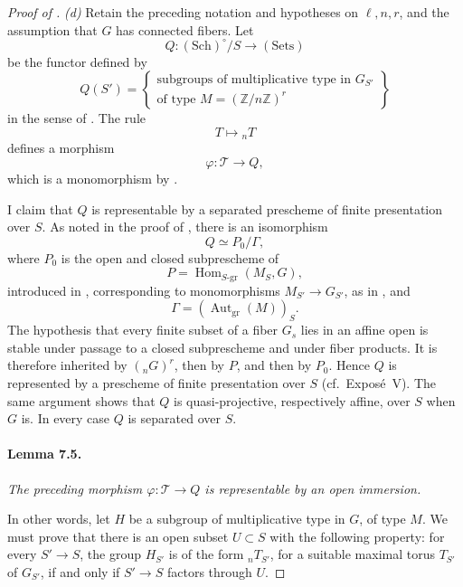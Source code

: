 \begin{proof}[Proof of ]
\emph{(d)} Retain the preceding notation and hypotheses on
\(\ell,n,r\), and the assumption that \(G\) has connected fibers.
Let
\[
  Q:(\mathrm{Sch})^\circ/S\longrightarrow(\mathrm{Sets})
\]
be the functor defined by
\[
  Q(S')=
  \left\{
  \begin{array}{c}
  \text{subgroups of multiplicative type in \(G_{S'}\)}\\
  \text{of type \(M=(\mathbb Z/n\mathbb Z)^r\)}
  \end{array}
  \right\}
\]
in the sense of . The rule
\[
  T\longmapsto{}_nT
\]
defines a morphism
\[
  \varphi:\mathcal T\longrightarrow Q,
\]
which is a monomorphism by .

I claim that \(Q\) is representable by a separated prescheme of
finite presentation over \(S\). As noted in the proof of
, there is an isomorphism
\[
  Q\simeq P_0/\Gamma,
\]
where \(P_0\) is the open and closed subprescheme of
\[
  P=\operatorname{Hom}_{S\text{-gr}}(M_S,G),
\]
introduced in \textup{}, corresponding to monomorphisms \(M_{S'}\to G_{S'}\), as in ,
and
\[
  \Gamma=(\operatorname{Aut}_{\mathrm{gr}}(M))_S.
\]
The hypothesis that every finite subset of a fiber \(G_s\) lies in
an affine open is stable under passage to a closed subprescheme and
under fiber products. It is therefore inherited by \(({}_nG)^r\),
then by \(P\), and then by \(P_0\). Hence \(Q\) is represented by a
prescheme of finite presentation over \(S\) (cf.\ Exposé~V). The same
argument shows that \(Q\) is quasi-projective, respectively affine,
over \(S\) when \(G\) is. In every case \(Q\) is separated over
\(S\).

\paragraph{\textbf{Lemma 7.5.}}
\emph{The preceding morphism
\(\varphi:\mathcal T\to Q\) is representable by an open immersion.}

In other words, let \(H\) be a subgroup of multiplicative type in
\(G\), of type \(M\). We must prove that there is an open subset
\(U\subset S\) with the following property: for every \(S'\to S\),
the group \(H_{S'}\) is of the form \({}_nT_{S'}\), for a suitable
maximal torus \(T_{S'}\) of \(G_{S'}\), if and only if
\(S'\to S\) factors through \(U\).


\end{proof}
